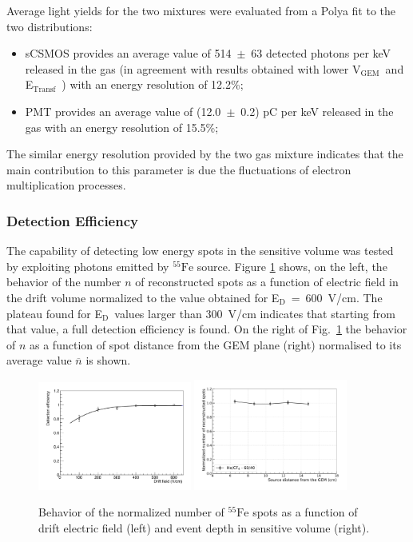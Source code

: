 \documentclass[physics,article,submit,moreauthors,pdftex]{Definitions/mdpi}
\newcommand{\fe}{\ensuremath{^{55}\textrm{Fe}}\xspace}
\newcommand{\Ed}  {E$_{\mathrm{D}}$\xspace}
\newcommand{\Et}  {E$_{\mathrm{Transf}}$\xspace}
\newcommand{\Vg}  {V$_{\mathrm{GEM}}$\xspace}
\begin{document}
Average light yields for the two mixtures were evaluated from a Polya fit \cite{bib:rolandiblum} to the two distributions:
\begin{itemize}
    \item sCSMOS provides an average value of 514~$\pm$~63 detected photons per keV released in the gas (in agreement with results obtained with lower \Vg\ and \Et\ \cite{bib:fe55}) with an energy resolution of 12.2\%;
    \item PMT provides an average value of (12.0~$\pm$~0.2) pC per keV released in the gas with an energy resolution of 15.5\%;

\end{itemize}


The similar energy resolution provided by the two gas mixture indicates that the main contribution to this parameter is due the fluctuations of electron multiplication processes.


\subsubsection{Detection Efficiency}

The capability of detecting low energy spots in the sensitive volume was tested by exploiting photons emitted by \fe source.
Figure \ref{fig:deteff} shows, on the left, the behavior of the number $n$ of reconstructed spots as a function of electric field in the drift volume normalized to the value obtained for \Ed~=~600~V/cm.
The plateau found for \Ed\ values larger than 300~V/cm indicates that starting from that value, a full detection efficiency is found. 
On the right of Fig.~\ref{fig:deteff} the behavior of $n$ as a function of spot distance from the GEM plane (right) normalised to its average value $\overline{n}$ is shown.

\begin{figure}[ht]
\centering
\includegraphics[width=0.45\textwidth]{gEff_Edrift.pdf}
\includegraphics[width=0.45\textwidth]{feZscan6040_wo_4.pdf}
\caption{Behavior of the normalized number of \fe spots as a function of drift electric field (left) and event depth in sensitive volume (right).} 
\label{fig:deteff}
\end{figure}
\end{document}
